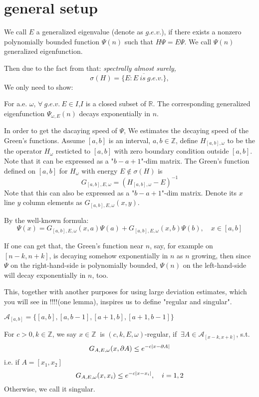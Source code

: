 \section{general setup}

\begin{definition}[$g.e.v.$]
    We call $E$ a generalized eigenvalue (denote as $g.e.v.$), if there exists a nonzero polynomially bounded function $\Psi(n)$ such that $H\Psi=E\Psi$. We call $\Psi(n)$ generalized eigenfunction.
\end{definition}
Then due to the fact from \cite{simon1982schrodinger} that:
\textit{spectrally almost surely,
\[
\sigma(H)=\overline{\{E:E~is~g.e.v.\}},
\]}
We only need to show:
\begin{thm}\label{thm1}
  For a.e. $\omega$, $\forall~g.e.v.~E\in I$,$I$ is a closed subset of $\mathbb{R}$. The corresponding generalized eigenfunction $\Psi_{\omega,E}(n)$ decays exponentially in $n$.
\end{thm}

In order to get the dacaying speed of $\Psi$, We estimates the decaying speed of the Green's functions. Assume $[a,b]$ is an interval, $a,b\in\mathbb{Z}$, define $H_{[a,b],\omega}$ to be the the operator $H_\omega$ resticted to $[a,b]$ with zero boundary condition outside $[a,b]$. Note that it can be expressed as a "$b-a+1$"-dim matrix.
The Green's function defined on $[a,b]$ for $H_\omega$ with energy $E\notin\sigma(H)$ is
  \[
    G_{[a,b],E,\omega}=(H_{[a,b],\omega}-E)^{-1}
  \]
Note that this can also be expressed as a "$b-a+1$"-dim matrix. Denote its $x$ line $y$ column elements as $G_{[a,b],E,\omega}(x,y)$.

By the well-known formula:
  \begin{equation}\label{possion}
    \Psi(x)=G_{[a,b],E,\omega}(x,a)\Psi(a)+G_{[a,b],E,\omega}(x,b)\Psi(b),\quad x\in[a,b]
  \end{equation}

If one can get that, the Green's function near $n$, say, for example on $[n-k,n+k]$, is decaying somehow exponentially in $n$ as $n$ growing, then since $\Psi$ on the  right-hand-side is polynomially bounded, $\Psi(n)$ on the left-hand-side will decay exponentially in $n$, too.

This, together with another purposes for using large deviation estimates, which you will see in !!!!(one lemma), inspires us to define "regular and singular".

\begin{definition}
$\mathcal{A}_{[a,b]}=\{[a,b],[a,b-1],[a+1,b],[a+1,b-1]\}$
\end{definition}
\begin{definition}
   For $c>0, k\in\mathbb{Z}$, we say $x\in\mathbb{Z}~$ is $(c,k,E,\omega)$-regular, if $~\exists A\in\mathcal{A}_{[x-k,x+k]}$, s.t.
  \[
    G_{A,E,\omega}(x,\partial A) \leq e^{-c\lvert x-\partial A\rvert}
  \]
  i.e. if $A=[x_1,x_2]$
  \[G_{A,E,\omega}(x,x_i) \leq e^{-c\lvert x-x_i\rvert},\quad i=1,2\]
  Otherwise, we call it singular.
\end{definition}

